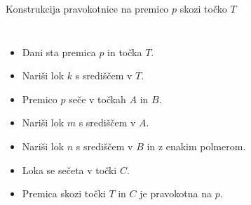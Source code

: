 \begin{frame}{Konstrukcija pravokotnice na premico $p$ skozi točko $T$}
\begin{columns}
		\begin{itemize}
			\item<1-> Dani sta premica $p$ in točka $T$.
			\item<2-> Nariši lok $k$ s središčem v $T$.
			\item<3-> Premico $p$ seče v točkah $A$ in $B$.
			\item<4-> Nariši lok $m$ s središčem v $A$.
			\item<5-> Nariši lok $n$ s središčem v $B$ in z enakim polmerom.
			\item<6-> Loka se sečeta v točki $C$.
			\item<7-> Premica skozi točki $T$ in $C$ je pravokotna na $p$.
		\end{itemize}
\end{columns}
\end{frame}
